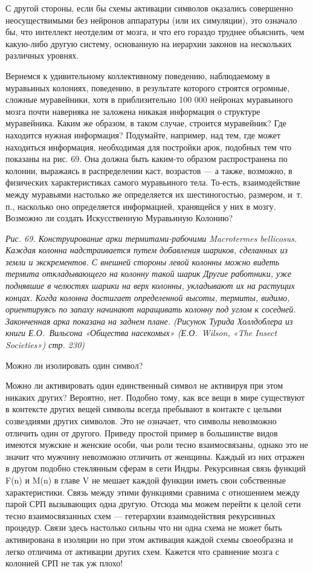\documentclass[../main.tex]{subfiles}
\begin{document}
С другой стороны, если бы схемы активации символов оказались совершенно неосуществимыми без нейронов аппаратуры (или их симуляции), это означало бы, что интеллект неотделим от мозга, и что его гораздо труднее объяснить, чем какую-либо другую систему, основанную на иерархии законов на нескольких различных уровнях.

Вернемся к удивительному коллективному поведению, наблюдаемому в муравьиных колониях, поведению, в результате которого строятся огромные, сложные муравейники, хотя в приблизительно 100 000 нейронах муравьиного мозга почти наверняка не заложена никакая информация о структуре муравейника. Каким же образом, в таком случае, строится муравейник? Где находится нужная информация? Подумайте, например, над тем, где может находиться информация, необходимая для постройки арок, подобных тем что показаны на рис. 69. Она должна быть каким-то образом распространена по колонии, выражаясь в распределении каст, возрастов --- а также, возможно, в физических характеристиках самого муравьиного тела. То-есть, взаимодействие между муравьями настолько же определяется их шестиногостью, размером, и~т.\,п., насколько оно определяется информацией, хранящейся у них в мозгу. Возможно ли создать Искусственную Муравьиную Колонию?

\emph{Рис. 69. Конструирование арки термитами-рабочими Macrotermes bellicosus. Каждая колонна надстраивается путем добавления шариков, сделанных из земли и экскрементов. С внешней стороны левой колонны можно видеть термита откладывающего на колонну такой шарик Другие работники, уже поднявшие в челюстях шарики на верх колонны, укладывают их на растущих концах. Когда колонна достигает определенной высоты, термиты, видимо, ориентируясь по запаху начинают наращивать колонну под углом к соседней. Законченная арка показана на заднем плане. (Рисунок Турида Холлдоблера из книги Е.О.~Вильсона «Общества насекомых» (Е.О.~Wilson, «The Insect Societies») стр. 230)}

Можно ли изолировать один символ?

Можно ли активировать один единственный символ не активируя при этом никаких других? Вероятно, нет. Подобно тому, как все вещи в мире существуют в контексте других вещей символы всегда пребывают в контакте с целыми созвездиями других символов. Это не означает, что символы невозможно отличить один от другого. Приведу простой пример в большинстве видов имеются мужские и женские особи, чьи роли тесно взаимосвязаны, однако это не значит что мужчину невозможно отличить от женщины. Каждый из них отражен в другом подобно стеклянным сферам в сети Индры. Рекурсивная связь функций F(n) и M(n) в главе V не мешает каждой функции иметь свои собственные характеристики. Связь между этими функциями сравнима с отношением между парой СРП вызывающих одна другую. Отсюда мы можем перейти к целой сети тесно взаимосвязанных схем --- гетерархии взаимодействия рекурсивных процедур. Связи здесь настолько сильны что ни одна схема не может быть активирована в изоляции но при этом активация каждой схемы своеобразна и легко отличима от активации других схем. Кажется что сравнение мозга с колонией СРП не так уж плохо!
\end{document}
